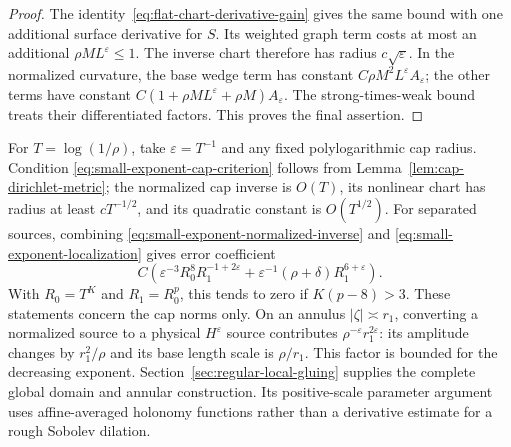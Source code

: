 \documentclass[11pt]{amsart}
\theoremstyle{definition}
\theoremstyle{remark}
\theoremstyle{plain}
\begin{document}
\begin{proof}
The identity~\eqref{eq:flat-chart-derivative-gain} gives
the same bound with one additional surface derivative for
$S$. Its weighted graph term costs at most an additional
$\rho ML^\varepsilon\leq1$. The inverse chart therefore
has radius $c\sqrt\varepsilon$. In the normalized curvature,
the base wedge term has constant
$C\rho M^2L^\varepsilon A_\varepsilon$; the other terms
have constant $C(1+\rho ML^\varepsilon+\rho M)A_\varepsilon$.
The strong-times-weak bound treats their differentiated factors.
This proves the final assertion.
\end{proof}

For $T=\log(1/\rho)$, take $\varepsilon=T^{-1}$ and any
fixed polylogarithmic cap radius. Condition
\eqref{eq:small-exponent-cap-criterion} follows from
Lemma~\ref{lem:cap-dirichlet-metric}; the normalized cap
inverse is $O(T)$, its nonlinear chart has radius at least
$cT^{-1/2}$, and its quadratic constant is $O(T^{1/2})$.
For separated sources, combining
\eqref{eq:small-exponent-normalized-inverse} and
\eqref{eq:small-exponent-localization} gives error coefficient
\begin{equation}\label{eq:decreasing-exponent-cap-error}
 C\left(\varepsilon^{-3}R_0^8R_1^{-1+2\varepsilon}
       +\varepsilon^{-1}(\rho+\delta)R_1^{6+\varepsilon}\right).
\end{equation}
With $R_0=T^K$ and $R_1=R_0^p$, this tends to zero if
$K(p-8)>3$. These statements concern the cap norms only.
On an annulus $|\zeta|\asymp r_1$, converting a normalized
source to a physical $H^\varepsilon$ source contributes
$\rho^{-\varepsilon}r_1^{2\varepsilon}$: its amplitude
changes by $r_1^2/\rho$ and its base length scale is
$\rho/r_1$. This factor is bounded for the decreasing
exponent. Section~\ref{sec:regular-local-gluing} supplies the
complete global domain and annular construction. Its positive-scale
parameter argument uses affine-averaged holonomy functions rather than a
derivative estimate for a rough Sobolev dilation.
\end{document}
